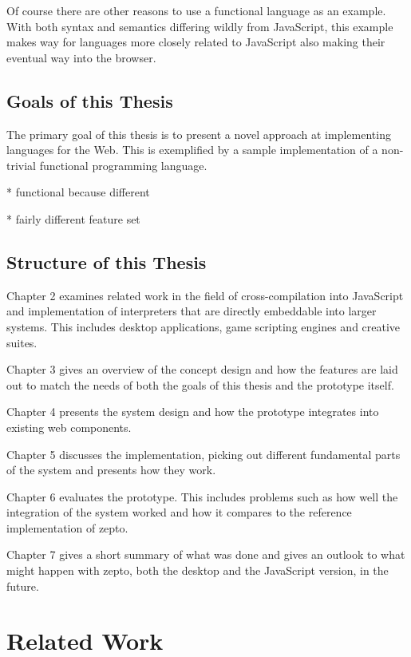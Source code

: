 \documentclass[oneside,11pt,xetex]{scrbook}
\begin{document}
Of course there are other reasons to use a functional language as an example. With both syntax
and semantics differing wildly from JavaScript, this example makes way for languages more
closely related to JavaScript also making their eventual way into the browser.

\section{Goals of this Thesis}

The primary goal of this thesis is to present a novel approach at implementing languages
for the Web. This is exemplified by a sample implementation of a non-trivial functional programming
language.

* functional because different

* fairly different feature set

\section{Structure of this Thesis}

Chapter 2 examines related work in the field of cross-compilation into JavaScript and implementation
of interpreters that are directly embeddable into larger systems. This includes desktop applications,
game scripting engines and creative suites.

Chapter 3 gives an overview of the concept design and how the features are laid out to match the needs
of both the goals of this thesis and the prototype itself.

Chapter 4 presents the system design and how the prototype integrates into existing web components.

Chapter 5 discusses the implementation, picking out different fundamental parts of the system and
presents how they work.

Chapter 6 evaluates the prototype. This includes problems such as how well the integration of the
system worked and how it compares to the reference implementation of zepto.

Chapter 7 gives a short summary of what was done and gives an outlook to what might happen with
zepto, both the desktop and the JavaScript version, in the future.

\chapter{Related Work}
\label{chap:RelatedWork}
\end{document}
